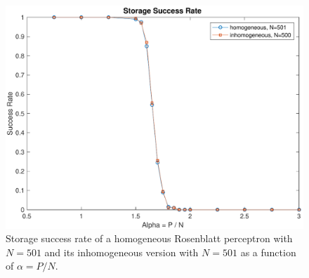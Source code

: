 \begin{figure}[t]
	\centering
	\includegraphics[width=\columnwidth]{figures/homogeneous_n_n1}
    \caption{Storage success rate of a homogeneous Rosenblatt perceptron with $N = 501$ and its inhomogeneous version with $N = 501$ as a function of $\alpha = P / N$.}
	\label{fig:homogeneous_n_n1}
\end{figure}
